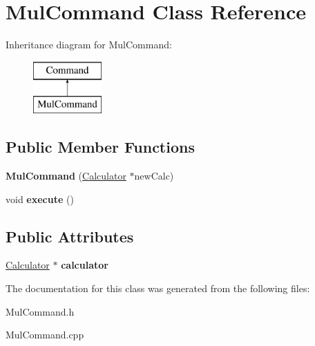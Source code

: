 \hypertarget{class_mul_command}{}\section{Mul\+Command Class Reference}
\label{class_mul_command}
Inheritance diagram for Mul\+Command\+:\begin{figure}[H]
\begin{center}
\leavevmode
\includegraphics[height=2.000000cm]{class_mul_command}
\end{center}
\end{figure}
\subsection*{Public Member Functions}
\begin{DoxyCompactItemize}
\item 
\hypertarget{class_mul_command_ad841942b274629dd6ef16ebff60adc0d}{}{\bfseries Mul\+Command} (\hyperlink{class_calculator}{Calculator} $\ast$new\+Calc)\label{class_mul_command_ad841942b274629dd6ef16ebff60adc0d}

\item 
\hypertarget{class_mul_command_a26122a47a8ddbca2b7a6a3991e04ed66}{}void {\bfseries execute} ()\label{class_mul_command_a26122a47a8ddbca2b7a6a3991e04ed66}

\end{DoxyCompactItemize}
\subsection*{Public Attributes}
\begin{DoxyCompactItemize}
\item 
\hypertarget{class_mul_command_ad1f527968e768963a14e1b59825022d0}{}\hyperlink{class_calculator}{Calculator} $\ast$ {\bfseries calculator}\label{class_mul_command_ad1f527968e768963a14e1b59825022d0}

\end{DoxyCompactItemize}


The documentation for this class was generated from the following files\+:\begin{DoxyCompactItemize}
\item 
Mul\+Command.\+h\item 
Mul\+Command.\+cpp\end{DoxyCompactItemize}
